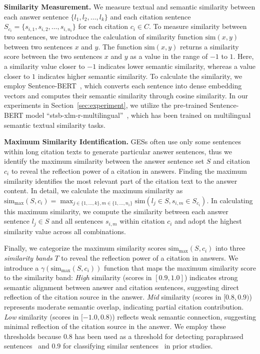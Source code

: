 \textbf{Similarity Measurement.}
We measure textual and semantic similarity between each answer sentence \( \{l_1, l_2, \ldots, l_k\} \) and each citation sentence \( S_{c_i} = \{s_{i,1}, s_{i,2}, \ldots, s_{i,n_i}\} \) for each citation \( c_i \in C \).
To measure similarity between two sentences, we introduce the calculation of similarity function \( \text{sim}(x, y) \) between two sentences \( x \) and \( y \).
The function \( \text{sim}(x, y) \) returns a similarity score between the two sentences \( x \) and \( y \) as a value in the range of \( -1 \) to \( 1 \).
Here, a similarity value closer to \(-1\) indicates lower semantic similarity, whereas a value closer to \(1\) indicates higher semantic similarity.
To calculate the similarity, we employ Sentence-BERT~\cite{sentence-bert-arxiv19}, which converts each sentence into dense embedding vectors and computes their semantic similarity through cosine similarity.
In our experiments in Section~\ref{sec:experiment}, we utilize the pre-trained Sentence-BERT model ``stsb-xlm-r-multilingual''~\cite{sentence-bert-arxiv19}, which has been trained on multilingual semantic textual similarity tasks.

\textbf{Maximum Similarity Identification.}
GESs often use only some sentences within long citation texts to generate particular answer sentences, thus we identify the maximum similarity between the answer sentence set \( S \) and citation \( c_i \) to reveal the reflection power of a citation in answers.
Finding the maximum similarity identifies the most relevant part of the citation text to the answer content.
In detail, we calculate the maximum similarity as \( \text{sim}_{\text{max}}(S, c_i) = \max_{j \in \{1,\ldots,k\}, m \in \{1,\ldots,n_i\}} \text{sim}(l_j \in S, s_{i,m} \in S_{c_i}) \).
In calculating this maximum similarity, we compute the similarity between each answer sentence \( l_j \in S \) and all sentences \( s_{i,m} \) within citation \( c_i \) and adopt the highest similarity value across all combinations.

Finally, we categorize the maximum similarity scores \( \text{sim}_{\text{max}}(S, c_i) \) into three \emph{similarity bands} \( T \) to reveal the reflection power of a citation in answers.
We introduce a $\gamma(\text{sim}_{\text{max}}(S, c_i))$ function that maps the maximum similarity score to the similarity band:
\emph{High} similarity (scores in \([0.9, 1.0]\)) indicates strong semantic alignment between answer and citation sentences, suggesting direct reflection of the citation source in the answer.
\emph{Mid} similarity (scores in \([0.8, 0.9)\)) represents moderate semantic overlap, indicating partial citation contribution.
\emph{Low} similarity (scores in \([-1.0, 0.8)\)) reflects weak semantic connection, suggesting minimal reflection of the citation source in the answer.
We employ these thresholds because \(0.8\) has been used as a threshold for detecting paraphrased sentences~\cite{kabir2024banglaembed} and \(0.9\) for classifying similar sentences~\cite{tumre2025improved} in prior studies.

